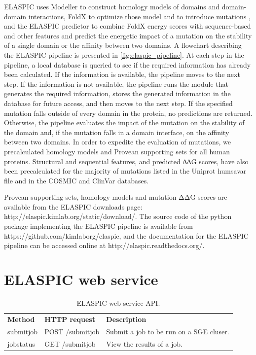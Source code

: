 ELASPIC uses Modeller \cite{webb_comparative_2002} to construct homology models of domains and domain-domain interactions, FoldX to optimize those model and to introduce mutations \cite{schymkowitz_foldx_2005}, and the ELASPIC predictor to combine FoldX energy scores with sequence-based and other features and predict the energetic impact of a mutation on the stability of a single domain or the affinity between two domains. A flowchart describing the ELASPIC pipeline is presented in \ref{fig:elaspic_pipeline}. At each step in the pipeline, a local database is queried to see if the required information has already been calculated. If the information is available, the pipeline moves to the next step. If the information is not available, the pipeline runs the module that generates the required information, stores the generated information in the database for future access, and then moves to the next step. If the specified mutation falls outside of every domain in the protein, no predictions are returned. Otherwise, the pipeline evaluates the impact of the mutation on the stability of the domain and, if the mutation falls in a domain interface, on the affinity between two domains. In order to expedite the evaluation of mutations, we precalculated homology models and Provean supporting sets for all human proteins. Structural and sequential features, and predicted ∆∆G scores, have also been precalculated for the majority of mutations listed in the Uniprot humsavar file \cite{consortium_uniprot:_2015} and in the COSMIC \cite{forbes_cosmic:_2015} and ClinVar \cite{landrum_clinvar:_2016} databases.

Provean supporting sets, homology models and mutation ΔΔG scores are available from the ELASPIC
downloads page: http://elaspic.kimlab.org/static/download/. The source code of the python package implementing the ELASPIC pipeline is available from https://github.com/kimlaborg/elaspic, and the documentation for the ELASPIC pipeline can be accessed online at http://elaspic.readthedocs.org/.


\section{ELASPIC web service}

\begin{table}[H]
	\centering
	\caption{ELASPIC web service API.}
	\label{my-label}
	\begin{tabular}{lll}
	\textbf{Method} & \textbf{HTTP request} & \textbf{Description} \\
	submitjob & POST /submitjob & Submit a job to be run on a SGE cluser. \\
	jobstatus & GET /submitjob & View the results of a job.
	\end{tabular}
\end{table}
